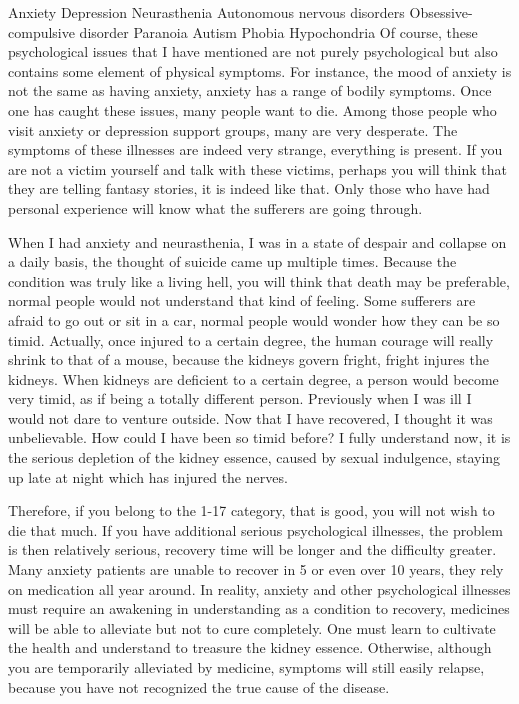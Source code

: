 \documentclass[
]{book}
\begin{document}
Anxiety
Depression
Neurasthenia
Autonomous nervous disorders
Obsessive-compulsive disorder
Paranoia
Autism
Phobia
Hypochondria
Of course, these psychological issues that I have mentioned are not purely psychological but also contains some element of physical symptoms. For instance, the mood of anxiety is not the same as having anxiety, anxiety has a range of bodily symptoms. Once one has caught these issues, many people want to die. Among those people who visit anxiety or depression support groups, many are very desperate. The symptoms of these illnesses are indeed very strange, everything is present. If you are not a victim yourself and talk with these victims, perhaps you will think that they are telling fantasy stories, it is indeed like that. Only those who have had personal experience will know what the sufferers are going through.

When I had anxiety and neurasthenia, I was in a state of despair and collapse on a daily basis, the thought of suicide came up multiple times. Because the condition was truly like a living hell, you will think that death may be preferable, normal people would not understand that kind of feeling. Some sufferers are afraid to go out or sit in a car, normal people would wonder how they can be so timid. Actually, once injured to a certain degree, the human courage will really shrink to that of a mouse, because the kidneys govern fright, fright injures the kidneys. When kidneys are deficient to a certain degree, a person would become very timid, as if being a totally different person. Previously when I was ill I would not dare to venture outside. Now that I have recovered, I thought it was unbelievable. How could I have been so timid before? I fully understand now, it is the serious depletion of the kidney essence, caused by sexual indulgence, staying up late at night which has injured the nerves.

Therefore, if you belong to the 1-17 category, that is good, you will not wish to die that much. If you have additional serious psychological illnesses, the problem is then relatively serious, recovery time will be longer and the difficulty greater. Many anxiety patients are unable to recover in 5 or even over 10 years, they rely on medication all year around. In reality, anxiety and other psychological illnesses must require an awakening in understanding as a condition to recovery, medicines will be able to alleviate but not to cure completely. One must learn to cultivate the health and understand to treasure the kidney essence. Otherwise, although you are temporarily alleviated by medicine, symptoms will still easily relapse, because you have not recognized the true cause of the disease.
\end{document}
